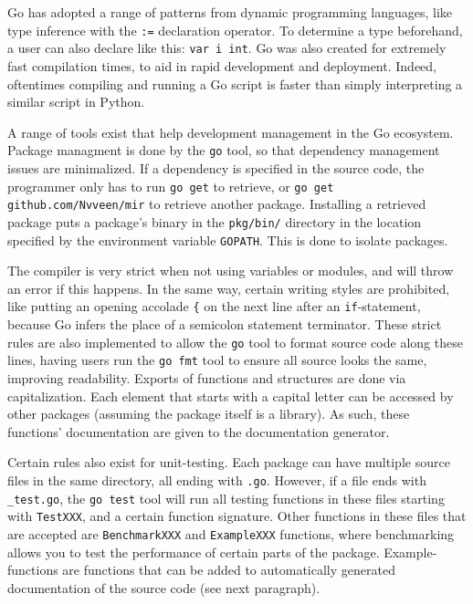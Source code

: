 \documentclass[]{article}
\begin{document}
Go has adopted a range of patterns from dynamic programming languages,
like type inference with the \texttt{:=} declaration operator. To
determine a type beforehand, a user can also declare like this:
\texttt{var i int}. Go was also created for extremely fast compilation
times, to aid in rapid development and deployment. Indeed, oftentimes
compiling and running a Go script is faster than simply interpreting a
similar script in Python.

A range of tools exist that help development management in the Go
ecosystem. Package managment is done by the \texttt{go} tool, so that
dependency management issues are minimalized. If a dependency is
specified in the source code, the programmer only has to run
\texttt{go get} to retrieve, or \texttt{go get github.com/Nvveen/mir} to
retrieve another package. Installing a retrieved package puts a
package's binary in the \texttt{pkg/bin/} directory in the location
specified by the environment variable \texttt{GOPATH}. This is done to
isolate packages.

The compiler is very strict when not using variables or modules, and
will throw an error if this happens. In the same way, certain writing
styles are prohibited, like putting an opening accolade \texttt{\{} on
the next line after an \texttt{if}-statement, because Go infers the
place of a semicolon statement terminator. These strict rules are also
implemented to allow the \texttt{go} tool to format source code along
these lines, having users run the \texttt{go fmt} tool to ensure all
source looks the same, improving readability. Exports of functions and
structures are done via capitalization. Each element that starts with a
capital letter can be accessed by other packages (assuming the package
itself is a library). As such, these functions' documentation are given
to the documentation generator.

Certain rules also exist for unit-testing. Each package can have
multiple source files in the same directory, all ending with
\texttt{.go}. However, if a file ends with \texttt{\_test.go}, the
\texttt{go test} tool will run all testing functions in these files
starting with \texttt{TestXXX}, and a certain function signature. Other
functions in these files that are accepted are \texttt{BenchmarkXXX} and
\texttt{ExampleXXX} functions, where benchmarking allows you to test the
performance of certain parts of the package. Example-functions are
functions that can be added to automatically generated documentation of
the source code (see next paragraph).
\end{document}
